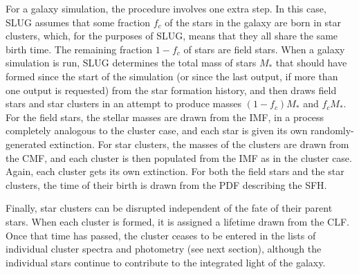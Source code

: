 \documentclass[letterpaper,10pt,english]{sphinxmanual}
\begin{document}
For a galaxy simulation, the procedure involves one extra step. In this case, SLUG assumes that some fraction \(f_c\) of the stars in the galaxy are born in star clusters, which, for the purposes of SLUG, means that they all share the same birth time. The remaining fraction \(1-f_c\) of stars are field stars. When a galaxy simulation is run, SLUG determines the total mass of stars \(M_*\) that should have formed since the start of the simulation (or since the last output, if more than one output is requested) from the star formation history, and then draws field stars and star clusters in an attempt to produce masses \((1-f_c)M_*\) and \(f_c M_*\). For the field stars, the stellar masses are drawn from the IMF, in a process completely analogous to the cluster case, and each star is given its own randomly-generated extinction. For star clusters, the masses of the clusters are drawn from the CMF, and each cluster is then populated from the IMF as in the cluster case. Again, each cluster gets its own extinction. For both the field stars and the star clusters, the time of their birth is drawn from the PDF describing the SFH.

Finally, star clusters can be disrupted independent of the fate of their parent stars. When each cluster is formed, it is assigned a lifetime drawn from the CLF. Once that time has passed, the cluster ceases to be entered in the lists of individual cluster spectra and photometry (see next section), although the individual stars continue to contribute to the integrated light of the galaxy.
\end{document}
